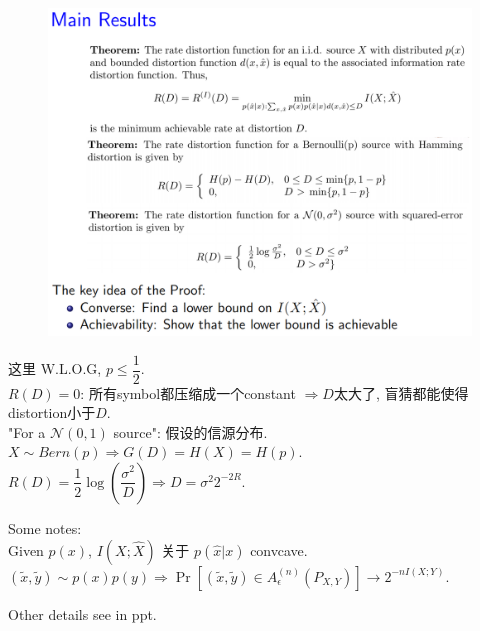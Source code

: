 \newpage

\begin{figure}[htbp]
    \centering
    \includegraphics[width=\textwidth]{./figures/chapter8/result.png}
\end{figure}
这里 W.L.O.G, $p\leq \dfrac{1}{2}$. \\
$R(D)=0$: 所有symbol都压缩成一个constant $\Rightarrow D$太大了, 盲猜都能使得distortion小于$D$. \\
"For a $\mathcal{N}(0,1)$ source": 假设的信源分布. \\
$X\sim Bern\left(p\right)\Rightarrow G(D)=H(X)=H(p)$. \\
$R(D)=\dfrac{1}{2}\log\left(\dfrac{\sigma^2}{D}\right)\Rightarrow D=\sigma^2 2^{-2R}$.

Some notes: \\
Given $p(x)$, $I(X;\hat{X})$ 关于 $p(\hat{x}|x)$ convcave. \\
$(\tilde{x}, \tilde{y})\sim p(x)p(y)\Rightarrow \Pr\left[(\tilde{x}, \tilde{y})\in A_{\epsilon}^{(n)}(P_{X,Y})\right] \to 2^{-nI(X;Y)}$.

Other details see in ppt.